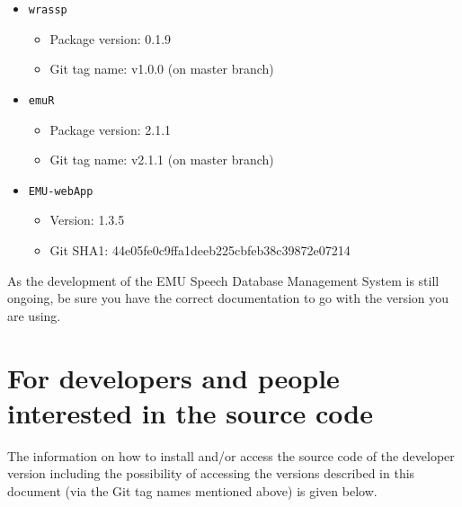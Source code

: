 \documentclass[
]{book}
\providecommand{\tightlist}{%
  \setlength{\itemsep}{0pt}\setlength{\parskip}{0pt}}
\begin{document}
\begin{itemize}
\tightlist
\item
  \texttt{wrassp}

  \begin{itemize}
  \tightlist
  \item
    Package version: 0.1.9
  \item
    Git tag name: v1.0.0 (on master branch)
  \end{itemize}
\item
  \texttt{emuR}

  \begin{itemize}
  \tightlist
  \item
    Package version: 2.1.1
  \item
    Git tag name: v2.1.1 (on master branch)
  \end{itemize}
\item
  \texttt{EMU-webApp}

  \begin{itemize}
  \tightlist
  \item
    Version: 1.3.5
  \item
    Git SHA1: 44e05fe0c9ffa1deeb225cbfeb38c39872e07214
  \end{itemize}
\end{itemize}

As the development of the EMU Speech Database Management System is still ongoing, be sure you have the correct documentation to go with the version you are using.

\hypertarget{for-developers-and-people-interested-in-the-source-code}{%
\section{For developers and people interested in the source code}\label{for-developers-and-people-interested-in-the-source-code}}

The information on how to install and/or access the source code of the developer version including the possibility of accessing the versions described in this document (via the Git tag names mentioned above) is given below.
\end{document}
